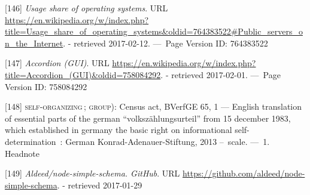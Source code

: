 \documentclass[12pt,english,a4paper,titlepage,cleardoublepage=empty,dottedtoc]{report}
\begin{document}
\hypertarget{ref-web_2017_wikipedia_os-market-share}{}
{[}146{]} \emph{Usage share of operating systems}. URL
\url{https://en.wikipedia.org/w/index.php?title=Usage_share_of_operating_systems\&oldid=764383522\#Public_servers_on_the_Internet}.
- retrieved 2017-02-12. ---~Page Version ID: 764383522

\hypertarget{ref-web_2016_wikipedia_accordion-gui}{}
{[}147{]} \emph{Accordion (GUI)}. URL
\url{https://en.wikipedia.org/w/index.php?title=Accordion_(GUI)\&oldid=758084292}.
- retrieved 2017-02-01. ---~Page Version ID: 758084292

\hypertarget{ref-court-decision_1983_census-act-germany}{}
{[}148{]} \textsc{self-organizing}\,; \textsc{group)}: Census act,
BVerfGE 65, 1 --- English translation of essential parts of the german
``volkszählungsurteil'' from 15 december 1983, which established in
germany the basic right on informational self-determination~: German
Konrad-Adenauer-Stiftung, 2013 --~scale. ---~1. Headnote

\hypertarget{ref-web_2017_repo_node-simple-schema}{}
{[}149{]} \emph{Aldeed/node-simple-schema. GitHub}. URL
\url{https://github.com/aldeed/node-simple-schema}. - retrieved
2017-01-29
\end{document}
